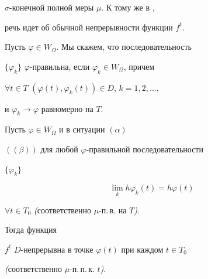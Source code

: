 $\sigma$-конечной полной меры $\mu$. К тому же в \cite{Sh6}, \cite{Sh7}


речь идет об обычной непрерывности функции $f^t$.





Пусть $\varphi\in W_\Omega$. Мы скажем, что последовательность


$\{\varphi_k\} $ \; $\varphi$-правильна, если $\varphi_k\in W_\Omega$, причем


$\forall t\in T$ \; $(\varphi(t),\varphi_k(t))\in D$, $k=1,2,\dotsc,$


и $\varphi_k\to\varphi$ равномерно на $T$.





\begin{thms} Пусть $\varphi\in W_\Omega$ и в ситуации $(\alpha)$


$((\beta))$ для любой $\varphi$-правильной последовательности


$\{\varphi_k\}$


\begin{equation}


\lim_k h\varphi_k(t)=h\varphi(t)


\end{equation}


$\forall t\in T_0$ {\em (}соответственно $\mu$-п.\,в. на $T${\em )}.


Тогда функция


$f^t$ \; $D$-непрерывна в точке $\varphi(t)$ при каждом $t\in T_0$


{\em (}соответственно $\mu$-п.\,п.\,к. $t${\em )}.


\end{thms}





